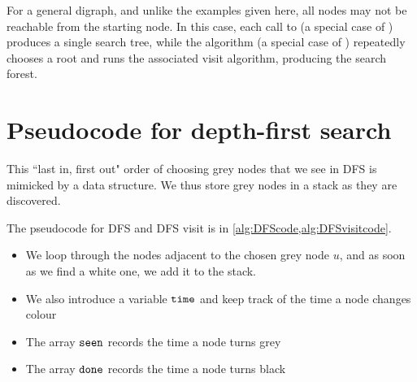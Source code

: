 For a general digraph, and unlike the examples given here, all nodes may not be reachable from the starting node. 
In this case, each call to  (a special case of ) produces a single search tree, 
while the algorithm  (a special case of ) repeatedly chooses a root and runs the associated visit algorithm, producing the search forest.

%
%
%

\section{Pseudocode for depth-first search}
\label{ss: DFS}

This ``last in, first out" order of choosing grey nodes that we see in DFS is mimicked by a  data structure. 
We thus store grey nodes in a stack as they are discovered. 

The pseudocode for DFS and DFS visit is in \cref{alg:DFScode,alg:DFSvisitcode}. 

\begin{itemize}
\item We loop through the nodes adjacent to the chosen grey node
$u$, and as soon as we find a white one, we add it to the stack.
\item We also introduce a variable $\timeVar$ and keep track of the time a node changes colour
\item The array $\seen$ records the time a node turns grey
\item The array  $\done$ records the time a node turns black
\end{itemize}

